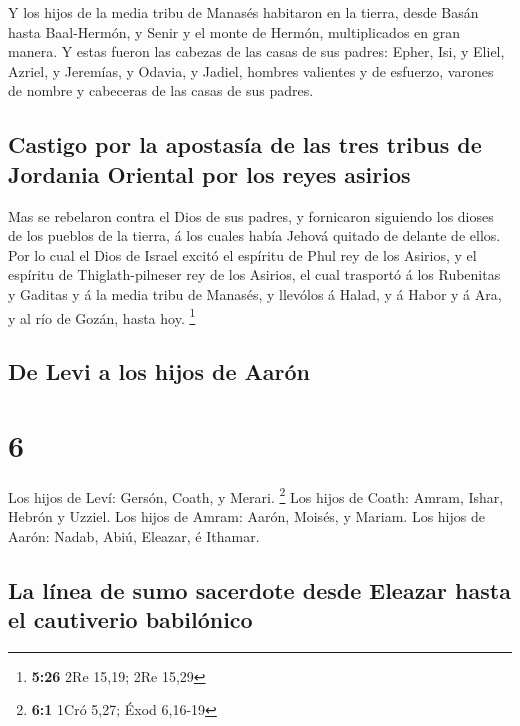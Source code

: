 Y los hijos de la media tribu de Manasés habitaron en la
tierra, desde Basán hasta Baal-Hermón, y Senir y el monte de Hermón,
multiplicados en gran manera.  Y estas fueron las cabezas
de las casas de sus padres: Epher, Isi, y Eliel, Azriel, y Jeremías, y
Odavia, y Jadiel, hombres valientes y de esfuerzo, varones de nombre y
cabeceras de las casas de sus padres.

\hypertarget{castigo-por-la-apostasuxeda-de-las-tres-tribus-de-jordania-oriental-por-los-reyes-asirios}{%
\subsection{Castigo por la apostasía de las tres tribus de Jordania
Oriental por los reyes
asirios}\label{castigo-por-la-apostasuxeda-de-las-tres-tribus-de-jordania-oriental-por-los-reyes-asirios}}

 Mas se rebelaron contra el Dios de sus padres, y
fornicaron siguiendo los dioses de los pueblos de la tierra, á los
cuales había Jehová quitado de delante de ellos.  Por lo
cual el Dios de Israel excitó el espíritu de Phul rey de los Asirios, y
el espíritu de Thiglath-pilneser rey de los Asirios, el cual trasportó á
los Rubenitas y Gaditas y á la media tribu de Manasés, y llevólos á
Halad, y á Habor y á Ara, y al río de Gozán, hasta hoy. \footnote{\textbf{5:26}
  2Re 15,19; 2Re 15,29}

\hypertarget{de-levi-a-los-hijos-de-aaruxf3n}{%
\subsection{De Levi a los hijos de
Aarón}\label{de-levi-a-los-hijos-de-aaruxf3n}}

\hypertarget{section-5}{%
\section{6}\label{section-5}}

 Los hijos de Leví: Gersón, Coath, y Merari. \footnote{\textbf{6:1}
  1Cró 5,27; Éxod 6,16-19}  Los hijos de Coath: Amram,
Ishar, Hebrón y Uzziel.  Los hijos de Amram: Aarón,
Moisés, y Mariam. Los hijos de Aarón: Nadab, Abiú, Eleazar, é Ithamar.

\hypertarget{la-luxednea-de-sumo-sacerdote-desde-eleazar-hasta-el-cautiverio-babiluxf3nico}{%
\subsection{La línea de sumo sacerdote desde Eleazar hasta el cautiverio
babilónico}\label{la-luxednea-de-sumo-sacerdote-desde-eleazar-hasta-el-cautiverio-babiluxf3nico}}

